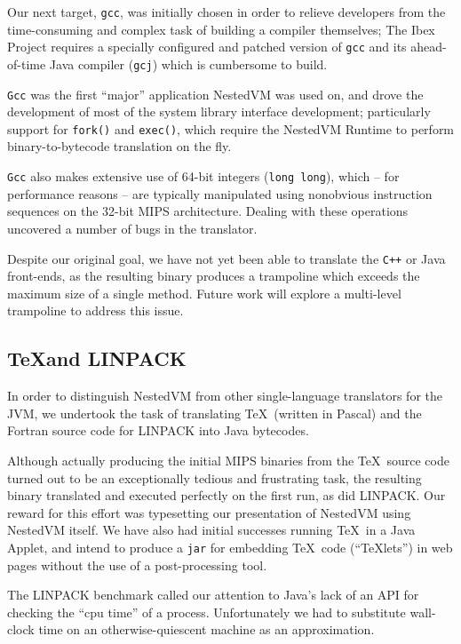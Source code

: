 \documentclass{acmconf}
\begin{document}
Our next target, {\tt gcc}, was initially chosen in order to relieve
developers from the time-consuming and complex task of building a
compiler themselves; The Ibex Project requires a specially configured
and patched version of {\tt gcc} and its ahead-of-time Java compiler
({\tt gcj}) which is cumbersome to build.

{\tt Gcc} was the first ``major'' application NestedVM was used on,
and drove the development of most of the system library interface
development; particularly support for {\tt fork()} and {\tt exec()},
which require the NestedVM Runtime to perform binary-to-bytecode
translation on the fly.

{\tt Gcc} also makes extensive use of 64-bit integers ({\tt long
long}), which -- for performance reasons -- are typically manipulated
using nonobvious instruction sequences on the 32-bit MIPS
architecture.  Dealing with these operations uncovered a number of
bugs in the translator.

Despite our original goal, we have not yet been able to translate the
{\tt C++} or Java front-ends, as the resulting binary produces a
trampoline which exceeds the maximum size of a single method.  Future
work will explore a multi-level trampoline to address this issue.


\subsection{\TeX and LINPACK}

In order to distinguish NestedVM from other single-language
translators for the JVM, we undertook the task of translating \TeX\
(written in Pascal) and the Fortran source code for LINPACK into Java
bytecodes.

Although actually producing the initial MIPS binaries from the \TeX\
source code turned out to be an exceptionally tedious and frustrating
task, the resulting binary translated and executed perfectly on the
first run, as did LINPACK.  Our reward for this effort was typesetting
our presentation of NestedVM using NestedVM itself.  We have also had
initial successes running \TeX\ in a Java Applet, and intend to
produce a {\tt jar} for embedding \TeX\ code (``\TeX lets'') in web
pages without the use of a post-processing tool.

The LINPACK benchmark called our attention to Java's lack of an API
for checking the ``cpu time'' of a process.  Unfortunately we had to
substitute wall-clock time on an otherwise-quiescent machine as an
approximation.
\end{document}
